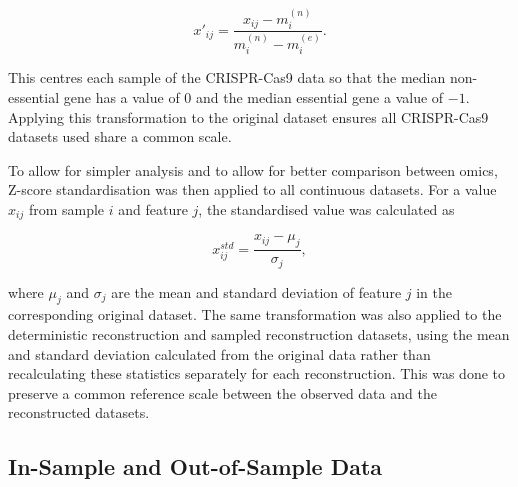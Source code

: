 \begin{equation}
   x'_{ij} = \frac{x_{ij} - m^{(n)}_i}{m^{(n)}_i - m^{(e)}_i}.
\end{equation}

This centres each sample of the CRISPR-Cas9 data so that the median non-essential gene has a value of 0 and the median essential gene a value of $-1$. Applying this transformation to the original dataset ensures all CRISPR-Cas9 datasets used share a common scale.

To allow for simpler analysis and to allow for better comparison between omics, Z-score standardisation was then applied to all continuous datasets. For a value $x_{ij}$ from sample $i$ and feature $j$, the standardised value was calculated as

\begin{equation}
   x_{ij}^{std} = \frac{x_{ij} - \mu_j}{\sigma_j},
\end{equation}

where $\mu_j$ and $\sigma_j$ are the mean and standard deviation of feature $j$ in the corresponding original dataset. The same transformation was also applied to the deterministic reconstruction and sampled reconstruction datasets, using the mean and standard deviation calculated from the original data rather than recalculating these statistics separately for each reconstruction. This was done to preserve a common reference scale between the observed data and the reconstructed datasets.

\subsection{In-Sample and Out-of-Sample Data} \label{sec:in_out_sample}

